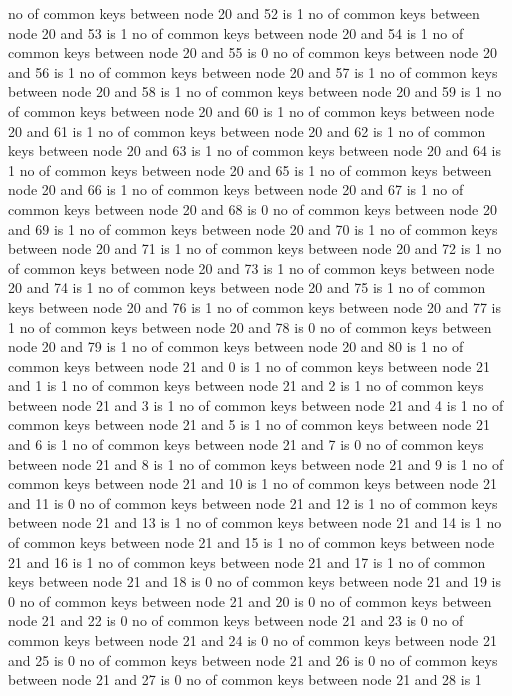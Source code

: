 no of common keys between node 20 and 52 is 1
no of common keys between node 20 and 53 is 1
no of common keys between node 20 and 54 is 1
no of common keys between node 20 and 55 is 0
no of common keys between node 20 and 56 is 1
no of common keys between node 20 and 57 is 1
no of common keys between node 20 and 58 is 1
no of common keys between node 20 and 59 is 1
no of common keys between node 20 and 60 is 1
no of common keys between node 20 and 61 is 1
no of common keys between node 20 and 62 is 1
no of common keys between node 20 and 63 is 1
no of common keys between node 20 and 64 is 1
no of common keys between node 20 and 65 is 1
no of common keys between node 20 and 66 is 1
no of common keys between node 20 and 67 is 1
no of common keys between node 20 and 68 is 0
no of common keys between node 20 and 69 is 1
no of common keys between node 20 and 70 is 1
no of common keys between node 20 and 71 is 1
no of common keys between node 20 and 72 is 1
no of common keys between node 20 and 73 is 1
no of common keys between node 20 and 74 is 1
no of common keys between node 20 and 75 is 1
no of common keys between node 20 and 76 is 1
no of common keys between node 20 and 77 is 1
no of common keys between node 20 and 78 is 0
no of common keys between node 20 and 79 is 1
no of common keys between node 20 and 80 is 1
no of common keys between node 21 and 0 is 1
no of common keys between node 21 and 1 is 1
no of common keys between node 21 and 2 is 1
no of common keys between node 21 and 3 is 1
no of common keys between node 21 and 4 is 1
no of common keys between node 21 and 5 is 1
no of common keys between node 21 and 6 is 1
no of common keys between node 21 and 7 is 0
no of common keys between node 21 and 8 is 1
no of common keys between node 21 and 9 is 1
no of common keys between node 21 and 10 is 1
no of common keys between node 21 and 11 is 0
no of common keys between node 21 and 12 is 1
no of common keys between node 21 and 13 is 1
no of common keys between node 21 and 14 is 1
no of common keys between node 21 and 15 is 1
no of common keys between node 21 and 16 is 1
no of common keys between node 21 and 17 is 1
no of common keys between node 21 and 18 is 0
no of common keys between node 21 and 19 is 0
no of common keys between node 21 and 20 is 0
no of common keys between node 21 and 22 is 0
no of common keys between node 21 and 23 is 0
no of common keys between node 21 and 24 is 0
no of common keys between node 21 and 25 is 0
no of common keys between node 21 and 26 is 0
no of common keys between node 21 and 27 is 0
no of common keys between node 21 and 28 is 1
